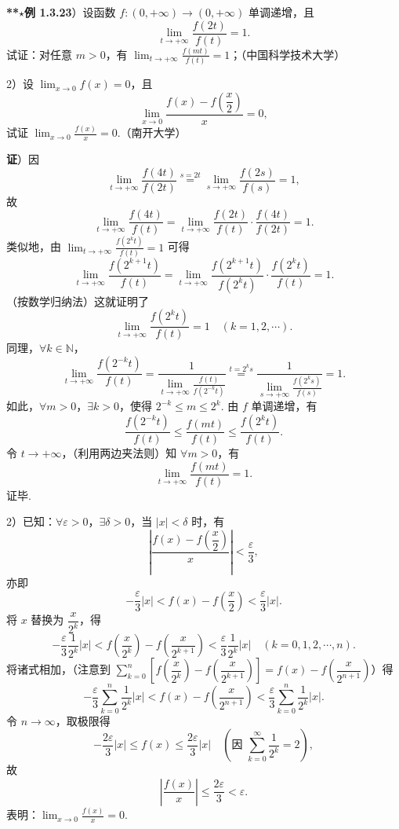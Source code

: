\documentclass[UTF8,12pt,a4paper,fontset=fandol]{ctexart}
\begin{document}
\noindent\textbf{**$\star$例 1.3.23}）设函数 $f:(0,+\infty)\to(0,+\infty)$ 单调递增，且
\[
  \lim_{t\to+\infty}\frac{f(2t)}{f(t)}=1.
\]
试证：对任意 $m>0$，有 $\displaystyle\lim_{t\to+\infty}\frac{f(mt)}{f(t)}=1$；（中国科学技术大学）

2）设 $\displaystyle\lim_{x\to0}f(x)=0$，且
\[
  \lim_{x\to0}\frac{f(x)-f\left(\dfrac x2\right)}x=0,
\]
试证 $\displaystyle\lim_{x\to0}\frac{f(x)}x=0$.（南开大学）

\noindent\textbf{证}）因
\[
  \lim_{t\to+\infty}\frac{f(4t)}{f(2t)}
  \overset{s=2t}{=}
  \lim_{s\to+\infty}\frac{f(2s)}{f(s)}=1,
\]
故
\[
  \lim_{t\to+\infty}\frac{f(4t)}{f(t)}
  =\lim_{t\to+\infty}\frac{f(2t)}{f(t)}\cdot
  \frac{f(4t)}{f(2t)}=1.
\]
类似地，由 $\displaystyle\lim_{t\to+\infty}\frac{f(2^kt)}{f(t)}=1$ 可得
\[
  \lim_{t\to+\infty}\frac{f(2^{k+1}t)}{f(t)}
  =\lim_{t\to+\infty}
  \frac{f(2^{k+1}t)}{f(2^kt)}\cdot
  \frac{f(2^kt)}{f(t)}=1.
\]
（按数学归纳法）这就证明了
\[
  \lim_{t\to+\infty}\frac{f(2^kt)}{f(t)}=1\quad(k=1,2,\cdots).
\]
同理，$\forall k\in\mathbb N$，
\[
  \lim_{t\to+\infty}\frac{f(2^{-k}t)}{f(t)}
  =
  \frac{1}{\displaystyle\lim_{t\to+\infty}\frac{f(t)}{f(2^{-k}t)}}
  \overset{t=2^ks}{=}
  \frac{1}{\displaystyle\lim_{s\to+\infty}\frac{f(2^ks)}{f(s)}}=1.
\]
如此，$\forall m>0$，$\exists k>0$，使得 $2^{-k}\le m\le2^k$. 由 $f$ 单调递增，有
\[
  \frac{f(2^{-k}t)}{f(t)}
  \le\frac{f(mt)}{f(t)}
  \le\frac{f(2^kt)}{f(t)}.
\]
令 $t\to+\infty$，（利用两边夹法则）知 $\forall m>0$，有
\[
  \lim_{t\to+\infty}\frac{f(mt)}{f(t)}=1.
\]
证毕.

2）已知：$\forall\varepsilon>0$，$\exists\delta>0$，当 $|x|<\delta$ 时，有
\[
  \left|\frac{f(x)-f\left(\dfrac x2\right)}x\right|<\frac\varepsilon3,
\]
亦即
\[
  -\frac\varepsilon3|x|
  <f(x)-f\left(\frac x2\right)
  <\frac\varepsilon3|x|.
\]
将 $x$ 替换为 $\dfrac{x}{2^k}$，得
\[
  -\frac\varepsilon3\frac1{2^k}|x|
  <f\left(\frac{x}{2^k}\right)-f\left(\frac{x}{2^{k+1}}\right)
  <\frac\varepsilon3\frac1{2^k}|x|
  \quad(k=0,1,2,\cdots,n).
\]
将诸式相加，（注意到
$\displaystyle\sum_{k=0}^n\left[f\left(\dfrac{x}{2^k}\right)-f\left(\dfrac{x}{2^{k+1}}\right)\right]
=f(x)-f\left(\dfrac{x}{2^{n+1}}\right)$）得
\[
  -\frac\varepsilon3\sum_{k=0}^n\frac1{2^k}|x|
  <f(x)-f\left(\frac{x}{2^{n+1}}\right)
  <\frac\varepsilon3\sum_{k=0}^n\frac1{2^k}|x|.
\]
令 $n\to\infty$，取极限得
\[
  -\frac{2\varepsilon}{3}|x|\le f(x)\le\frac{2\varepsilon}{3}|x|
  \quad\left(\text{因 }\sum_{k=0}^\infty\frac1{2^k}=2\right),
\]
故
\[
  \left|\frac{f(x)}x\right|\le\frac{2\varepsilon}{3}<\varepsilon.
\]
表明：$\displaystyle\lim_{x\to0}\frac{f(x)}x=0$.
\end{document}
